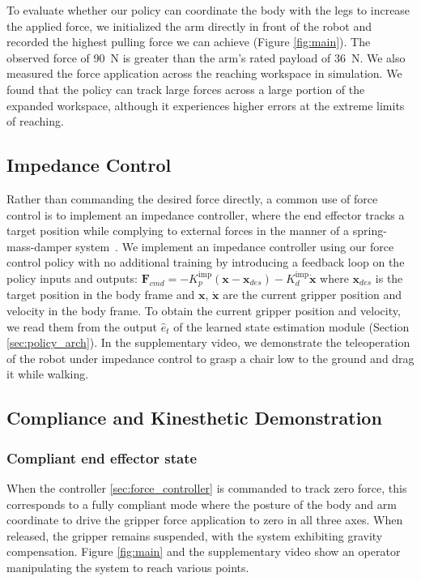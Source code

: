To evaluate whether our policy can coordinate the body with the legs to increase the applied force, we initialized the arm directly in front of the robot and recorded the highest pulling force we can achieve (Figure \ref{fig:main}). The observed force of \SI{90}{\newton} is greater than the arm's rated payload of \SI{36}{\newton}. We also measured the force application across the reaching workspace in simulation. We found that the policy can track large forces across a large portion of the expanded workspace, although it experiences higher errors at the extreme limits of reaching.


\subsection{Impedance Control}
Rather than commanding the desired force directly, a common use of force control is to implement an impedance controller, where the end effector tracks a target position while complying to external forces in the manner of a spring-mass-damper system~\cite{hogan1984impedance, hogan1985impedance}. We implement an impedance controller using our force control policy with no additional training by introducing a feedback loop on the policy inputs and outputs: $\textbf{F}_{cmd} = -K_p^\textrm{imp}(\textbf{x} - \textbf{x}_{des}) - K_d^\textrm{imp} \dot{\textbf{x}}$ where $\textbf{x}_{des}$ is the target position in the body frame and $\textbf{x}$, $\dot{\textbf{x}}$ are the current gripper position and velocity in the body frame. To obtain the current gripper position and velocity, we read them from the output $\hat{e}_t$ of the learned state estimation module (Section \ref{sec:policy_arch}).  In the supplementary video, we demonstrate the teleoperation of the robot under impedance control to grasp a chair low to the ground and drag it while walking.


\subsection{Compliance and Kinesthetic Demonstration}

\label{sec:applications}

\subsubsection{Compliant end effector state}

When the controller \ref{sec:force_controller} is commanded to track zero force, this corresponds to a fully compliant mode where the posture of the body and arm coordinate to drive the gripper force application to zero in all three axes. When released, the gripper remains suspended, with the system exhibiting gravity compensation. Figure \ref{fig:main} and the supplementary video show an operator manipulating the system to reach various points.


